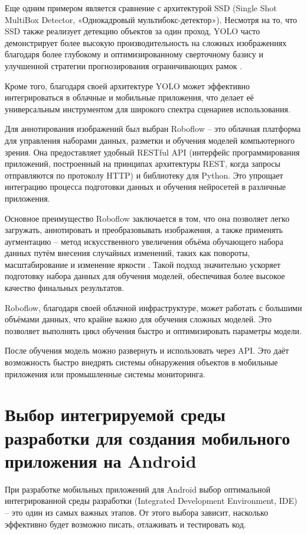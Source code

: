 Еще одним примером является сравнение с архитектурой SSD (Single Shot MultiBox Detector, «Однокадровый мультибокс-детектор»). Несмотря на то, что SSD также реализует детекцию объектов за один проход, YOLO часто демонстрирует более высокую производительность на сложных изображениях благодаря более глубокому и оптимизированному сверточному базису и улучшенной стратегии прогнозирования ограничивающих рамок \cite{lishchenko2022online}.

Кроме того, благодаря своей архитектуре YOLO может эффективно интегрироваться в облачные и мобильные приложения, что делает её универсальным инструментом для широкого спектра сценариев использования.

Для аннотирования изображений был выбран Roboflow -- это облачная платформа для управления наборами данных, разметки и обучения моделей компьютерного зрения. Она предоставляет удобный RESTful API (интерфейс программирования приложений, построенный на принципах архитектуры REST, когда запросы отправляются по протоколу HTTP) и библиотеку для Python. Это упрощает интеграцию процесса подготовки данных и обучения нейросетей в различные приложения.

Основное преимущество Roboflow заключается в том, что она позволяет легко загружать, аннотировать и преобразовывать изображения, а также применять аугментацию -- метод искусственного увеличения объёма обучающего набора данных путём внесения случайных изменений, таких как повороты, масштабирование и изменение яркости \cite{kukartsev2024deep}. Такой подход значительно ускоряет подготовку набора данных для обучения моделей, обеспечивая более высокое качество финальных результатов.

Roboflow, благодаря своей облачной инфраструктуре, может работать с большими объёмами данных, что крайне важно для обучения сложных моделей. Это позволяет выполнять цикл обучения быстро и оптимизировать параметры модели.

После обучения модель можно развернуть и использовать через API. Это даёт возможность быстро внедрять системы обнаружения объектов в мобильные приложения или промышленные системы мониторинга\cite{богданов2019технология}.

\section{Выбор интегрируемой среды разработки для создания мобильного приложения на Android}

При разработке мобильных приложений для Android выбор оптимальной интегрированной среды разработки (Integrated Development Environment, IDE) -- это один из самых важных этапов. От этого выбора зависит, насколько эффективно будет возможно писать, отлаживать и тестировать код.

